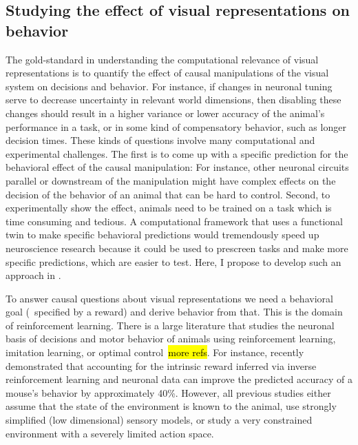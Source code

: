 \documentclass[B2,COG]{ercgrant}
\begin{document}
\subsection{Studying the effect of visual representations on behavior}
The gold-standard in understanding the computational relevance of visual representations  is to quantify the effect of causal manipulations of the visual system on decisions and behavior. 
For instance, if changes in neuronal tuning serve to decrease uncertainty in relevant world dimensions, then disabling these changes should result in a higher variance or lower accuracy of the animal's performance in a task, or in some kind of compensatory behavior, such as longer decision times.
These kinds of questions involve many computational and experimental challenges. 
The first is to come up with a specific prediction for the behavioral effect of the causal manipulation: For instance, other neuronal circuits parallel or downstream of the manipulation might have complex effects on the decision of the behavior of an animal that can be hard to control. 
Second, to experimentally show the effect, animals need to be trained on a task which is time consuming and tedious. 
A computational framework that uses a functional twin to make specific behavioral predictions would tremendously speed up neuroscience research because it could be used to prescreen tasks and make more specific predictions, which are easier to test. 
Here, I propose to develop such an approach in . 

To answer causal questions about visual representations we need a behavioral goal (\eg~specified by a reward) and derive behavior from that. 
This is the domain of reinforcement learning.
There is a large literature that studies the neuronal basis of decisions and motor behavior of animals using reinforcement learning, imitation learning, or optimal control~\parencite{Schultz1997-xu,Todorov2004-yb, Morris2006-ub, Botvinick2009-nn, Yamaguchi2018-xp, Miyazaki2018-gy}\hl{more refs}.
For instance, \textcite{Kalweit2022-ev} recently demonstrated that accounting for the intrinsic reward inferred via inverse reinforcement learning and neuronal data can improve the predicted accuracy of a mouse's behavior by approximately 40\%.
However, all previous studies either assume that the state of the environment is known to the animal, use strongly simplified (low dimensional) sensory models, or study a very constrained environment with a severely limited action space. 
\end{document}
